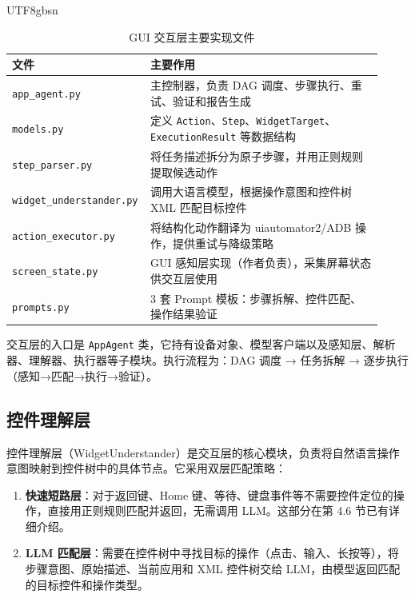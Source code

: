 \documentclass{article}
\begin{document}
\begin{CJK}{UTF8}{gbsn}
\begin{table}[h]
  \centering
  \caption{GUI 交互层主要实现文件}
  \label{tab:interaction_files}
  \begin{tabular}{p{0.3\linewidth}p{0.62\linewidth}}
    \toprule
    文件 & 主要作用 \\
    \midrule
    \texttt{app\_agent.py} & 主控制器，负责 DAG 调度、步骤执行、重试、验证和报告生成 \\
    \texttt{models.py} & 定义 \texttt{Action}、\texttt{Step}、\texttt{WidgetTarget}、\texttt{ExecutionResult} 等数据结构 \\
    \texttt{step\_parser.py} & 将任务描述拆分为原子步骤，并用正则规则提取候选动作 \\
    \texttt{widget\_understander.py} & 调用大语言模型，根据操作意图和控件树 XML 匹配目标控件 \\
    \texttt{action\_executor.py} & 将结构化动作翻译为 uiautomator2/ADB 操作，提供重试与降级策略 \\
    \texttt{screen\_state.py} & GUI 感知层实现（作者负责），采集屏幕状态供交互层使用 \\
    \texttt{prompts.py} & 3 套 Prompt 模板：步骤拆解、控件匹配、操作结果验证 \\
    \bottomrule
  \end{tabular}
\end{table}

交互层的入口是 \texttt{AppAgent} 类，它持有设备对象、模型客户端以及感知层、解析器、理解器、执行器等子模块。执行流程为：DAG 调度 → 任务拆解 → 逐步执行（感知→匹配→执行→验证）。

\subsection{控件理解层}

控件理解层（WidgetUnderstander）是交互层的核心模块，负责将自然语言操作意图映射到控件树中的具体节点。它采用双层匹配策略：

\begin{enumerate}[leftmargin=1.5em]
  \item \textbf{快速短路层}：对于返回键、Home 键、等待、键盘事件等不需要控件定位的操作，直接用正则规则匹配并返回，无需调用 LLM。这部分在第 4.6 节已有详细介绍。
  \item \textbf{LLM 匹配层}：需要在控件树中寻找目标的操作（点击、输入、长按等），将步骤意图、原始描述、当前应用和 XML 控件树交给 LLM，由模型返回匹配的目标控件和操作类型。
\end{enumerate}


\end{CJK}
\end{document}
